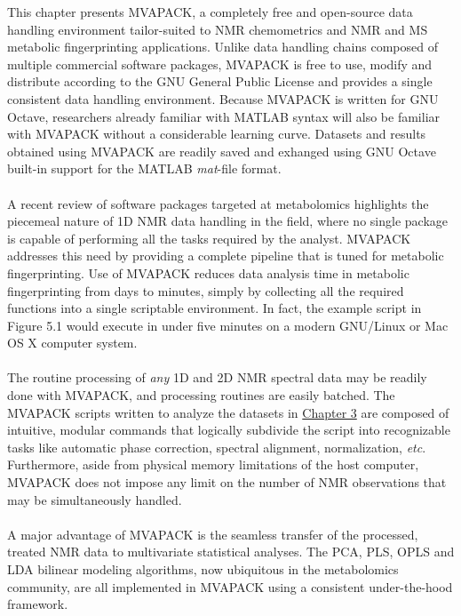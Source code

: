 \begin{doublespace}
This chapter presents MVAPACK, a completely free and open-source data handling
environment tailor-suited to NMR chemometrics and \hnmr{} NMR and MS metabolic
fingerprinting applications. Unlike data handling chains composed of multiple
commercial software packages, MVAPACK is free to use, modify and distribute
according to the GNU General Public License \cite{gpl3} and provides a single
consistent data handling environment. Because MVAPACK is written for GNU
Octave, researchers already familiar with MATLAB syntax will also be familiar
with MVAPACK without a considerable learning curve. Datasets and results
obtained using MVAPACK are readily saved and exhanged using GNU Octave built-in
support for the MATLAB {\it mat}-file format.
\\\\
A recent review \cite{izquierdo:pnmrs2011} of software packages targeted at
metabolomics highlights the piecemeal nature of 1D \hnmr{} NMR data handling
in the field, where no single package is capable of performing all the tasks
required by the analyst. MVAPACK addresses this need by providing a complete
pipeline that is tuned for metabolic fingerprinting. Use of MVAPACK reduces
data analysis time in metabolic fingerprinting from days to minutes, simply
by collecting all the required functions into a single scriptable environment.
In fact, the example script in Figure 5.1 would execute in under five minutes
on a modern GNU/Linux or Mac OS X computer system.
\\\\
The routine processing of {\it any} 1D and 2D NMR spectral data may be readily
done with MVAPACK, and processing routines are easily batched. The MVAPACK
scripts written to analyze the datasets in \hyperlink{chapter.3}{Chapter 3}
are composed of intuitive, modular commands that logically subdivide the script
into recognizable tasks like automatic phase correction, spectral alignment,
normalization, {\it etc}. Furthermore, aside from physical memory limitations
of the host computer, MVAPACK does not impose any limit on the number of NMR
observations that may be simultaneously handled.
\\\\
A major advantage of MVAPACK is the seamless transfer of the processed, treated
NMR data to multivariate statistical analyses. The PCA, PLS, OPLS and LDA
bilinear modeling algorithms, now ubiquitous in the metabolomics community,
are all implemented in MVAPACK using a consistent under-the-hood framework.

\end{doublespace}
